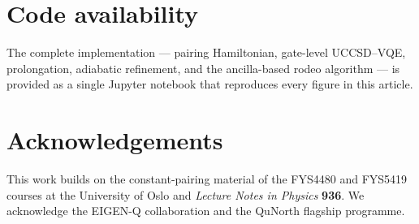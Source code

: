 \documentclass[11pt]{article}
\begin{document}
\section*{Code availability}
The complete implementation --- pairing Hamiltonian, gate-level UCCSD--VQE,
prolongation, adiabatic refinement, and the ancilla-based rodeo algorithm --- is
provided as a single Jupyter notebook that reproduces every figure in this article.

\section*{Acknowledgements}
This work builds on the constant-pairing material of the FYS4480 and FYS5419 courses
at the University of Oslo and \emph{Lecture Notes in Physics} \textbf{936}.  We
acknowledge the EIGEN-Q collaboration and the QuNorth flagship programme.
\end{document}
